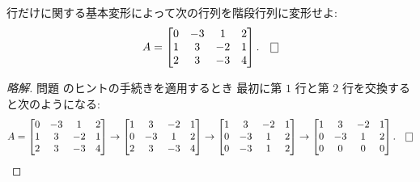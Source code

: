 \documentclass[12pt,twoside]{jarticle}
\newcommand\commentout[1]{#1}
\newcommand\commentout[1]{}
\begin{document}

\begin{question}
  \label{q:kaidan-2}
  行だけに関する基本変形によって次の行列を階段行列に変形せよ:
  \begin{equation*}
    A = 
    \begin{bmatrix}
      0 & -3 &  1 & 2 \\
      1 &  3 & -2 & 1 \\
      2 &  3 & -3 & 4 \\
    \end{bmatrix}.
    \qed
  \end{equation*}
\end{question}

\commentout{
\begin{proof}[略解]
  問題  のヒントの手続きを適用するとき
  最初に第 $1$ 行と第 $2$ 行を交換すると次のようになる:
  {\small
  \begin{equation*}
    A = 
    \begin{bmatrix}
      0 & -3 &  1 & 2 \\
      1 &  3 & -2 & 1 \\
      2 &  3 & -3 & 4 \\
    \end{bmatrix}
    \to
    \begin{bmatrix}
      1 &  3 & -2 & 1 \\
      0 & -3 &  1 & 2 \\
      2 &  3 & -3 & 4 \\
    \end{bmatrix}
    \to
    \begin{bmatrix}
      1 &  3 & -2 & 1 \\
      0 & -3 &  1 & 2 \\
      0 & -3 &  1 & 2 \\
    \end{bmatrix}
    \to 
    \begin{bmatrix}
      1 &  3 & -2 & 1 \\
      0 & -3 &  1 & 2 \\
      0 &  0 &  0 & 0 \\
    \end{bmatrix}.
    \qed
  \end{equation*}
  }
\end{proof}
}

\end{document}
